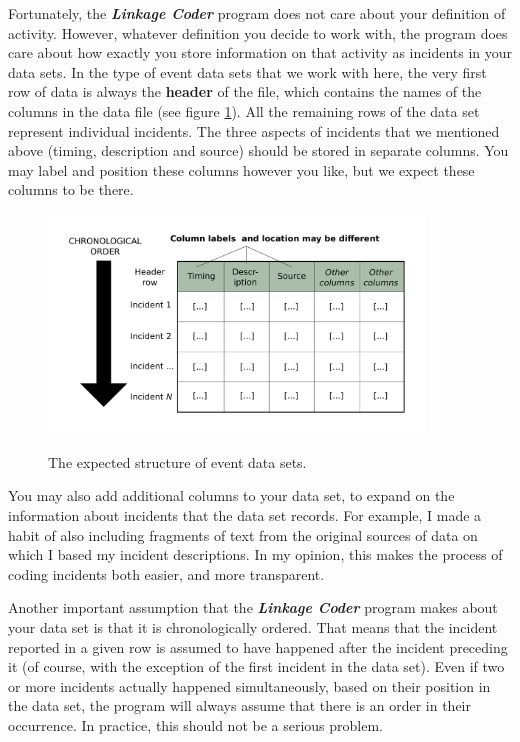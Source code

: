 \documentclass{memoir}
\begin{document}
Fortunately, the \emph{\textbf{Linkage Coder}} program does not care about your definition of activity. However, whatever definition you decide to work with, the program does care about how exactly you store information on that activity as incidents in your data sets. In the type of event data sets that we work with here, the very first row of data is always the \textbf{header} of the file, which contains the names of the columns in the data file (see figure \ref{fig:datasetstructure}). All the remaining rows of the data set represent individual incidents. The three aspects of incidents that we mentioned above (timing, description and source) should be stored in separate columns. You may label and position these columns however you like, but we expect these columns to be there.

\begin{figure}[h!]
  \centering
  \caption{The expected structure of event data sets.}
  \includegraphics[width=100mm]{Diagram_4.pdf}
  \label{fig:datasetstructure}
\end{figure}

You may also add additional columns to your data set, to expand on the information about incidents that the data set records. For example, I made a habit of also including fragments of text from the original sources of data on which I based my incident descriptions. In my opinion, this makes the process of coding incidents both easier, and more transparent.    

Another important assumption that the \textbf{\emph{Linkage Coder}} program makes about your data set is that it is chronologically ordered. That means that the incident reported in a given row is assumed to have happened after the incident preceding it (of course, with the exception of the first incident in the data set). Even if two or more incidents actually happened simultaneously, based on their position in the data set, the program will always assume that there is an order in their occurrence. In practice, this should not be a serious problem.
\end{document}
